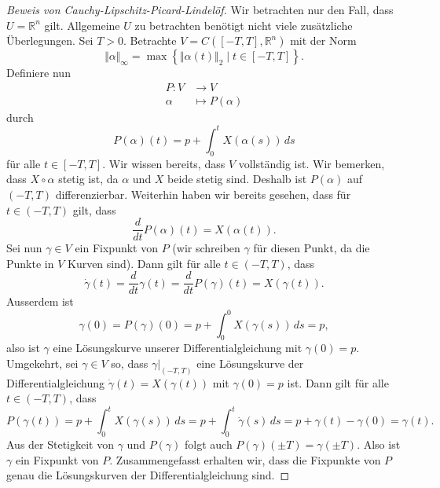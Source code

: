 \documentclass[../main.tex]{subfiles}
\begin{document}
\begin{proof}[Beweis von Cauchy-Lipschitz-Picard-Lindelöf]
  Wir betrachten nur den Fall, dass $U = \mathbb{R}^n$ gilt.
  Allgemeine $U$ zu betrachten benötigt nicht viele zusätzliche
  Überlegungen.
  Sei $T > 0$.
  Betrachte $V = C([-T, T], \mathbb{R}^n)$
  mit der Norm
  \[
    \Vert \alpha \Vert_{\infty} = \max \left\{\Vert \alpha(t) \Vert_2
    \mid t \in [-T, T]\right\}.
  \]
  Definiere nun
  \begin{align*}
    P \colon V & \to V \\
    \alpha & \mapsto P(\alpha)
  \end{align*}
  durch
  \[
    P(\alpha)(t) = p + \int_{0}^{t} X(\alpha(s)) \, ds
  \]
  für alle $t \in [-T, T]$.
  Wir wissen bereits, dass $V$ vollständig ist. %
  Wir bemerken, dass $X \circ \alpha$ stetig ist,
  da $\alpha$ und $X$ beide stetig sind. Deshalb
  ist $P(\alpha)$ auf $(-T, T)$ differenzierbar.
  Weiterhin haben wir bereits gesehen,
  dass für $t \in (-T, T)$ gilt, dass
  \[
    \frac{d}{dt} P(\alpha)(t) = X(\alpha(t)).
  \]
  Sei nun $\gamma \in V$ ein Fixpunkt von $P$
  (wir schreiben $\gamma$ für diesen Punkt,
  da die Punkte in $V$ Kurven sind). %
  Dann gilt für alle $t \in (-T, T)$, dass
  \[
    \dot \gamma(t) = \frac{d}{dt}\gamma(t) =
    \frac{d}{dt} P(\gamma)(t)
    = X(\gamma(t)).
  \]
  Ausserdem ist
  \[
    \gamma(0) = P(\gamma)(0) = p + \int_{0}^{0} X(\gamma(s)) \, ds
    = p,
  \]
  also ist $\gamma$ eine Lösungskurve unserer
  Differentialgleichung mit $\gamma(0) = p$.
  Umgekehrt, sei $\gamma \in V$ so, dass
  $\gamma|_{(-T, T)}$ eine Lösungskurve der Differentialgleichung
  $\dot \gamma(t) = X(\gamma(t))$ mit $\gamma(0) = p$ ist.
  Dann gilt für alle $t \in (-T, T)$,
  dass
  \[
    P(\gamma(t)) = p + \int_{0}^{t} X(\gamma(s)) \, ds
    = p + \int_{0}^{t} \dot \gamma(s) \, ds
    = p + \gamma(t) - \gamma(0)
    = \gamma(t).
  \]
  Aus der Stetigkeit von $\gamma$ und $P(\gamma)$ 
  folgt auch $P(\gamma)(\pm T) = \gamma(\pm T)$.
  Also ist $\gamma$ ein Fixpunkt von $P$.
  Zusammengefasst erhalten wir, dass
  die Fixpunkte von $P$ genau die Lösungskurven
  der Differentialgleichung sind.


\end{proof}
\end{document}
